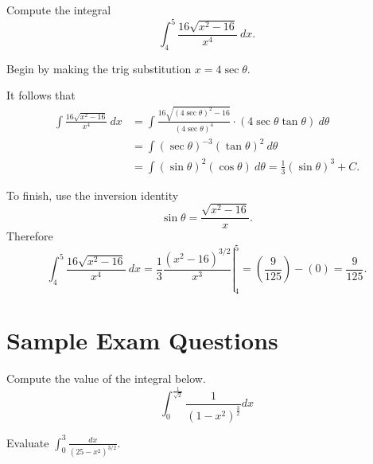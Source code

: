 \documentclass{ximera}
\begin{document}
\begin{question}%

Compute the integral 
\[\int_{4}^{5}\frac{16\sqrt{x^2-16}}{x^{4}}~dx.\]
\begin{multiplechoice}
\end{multiplechoice}
\begin{feedback}
Begin by making the trig substitution \(x=4\sec \theta\). \begin{hint} It follows that 
\[ \begin{aligned} \int\frac{16\sqrt{x^2-16}}{x^{4}}~dx & = \int \frac{16\sqrt{(4\sec \theta)^2-16}}{(4\sec \theta)^{4}} \cdot (4\sec \theta\tan \theta)~d \theta \\
 & = \int (\sec \theta)^{-3}(\tan \theta)^{2}~d \theta \\ & = \int (\sin \theta)^{2}(\cos \theta) ~ d \theta = \frac{1}{3}(\sin \theta)^{3} + C. \end{aligned} \] \begin{hint}
To finish, use the inversion identity \[\sin \theta = \frac{\sqrt{x^2-16}}{x}.\]
Therefore \[\int_{4}^{5}\frac{16\sqrt{x^2-16}}{x^{4}}~dx = \left.\frac{1}{3}\frac{(x^2-16)^{3/2}}{x^{3}}\right|_{4}^{5} = \left(\frac{9}{125}\right) - \left(0\right) = \frac{9}{125}.\] \end{hint} \end{hint}
\end{feedback}

\end{question}



\section*{Sample Exam Questions}

\begin{question}%

Compute the value of the integral below.
\[ \int_0^{\frac{1}{\sqrt{2}}} \frac{1}{(1-x^2)^{\frac{3}{2}}} dx \]
\begin{multiplechoice}
\end{multiplechoice}

\end{question}

\begin{question}%

Evaluate \(\displaystyle \int_0^3 \frac{dx}{(25-x^2)^{3/2}}\).
\begin{multiplechoice}
\end{multiplechoice}

\end{question}
\end{document}
